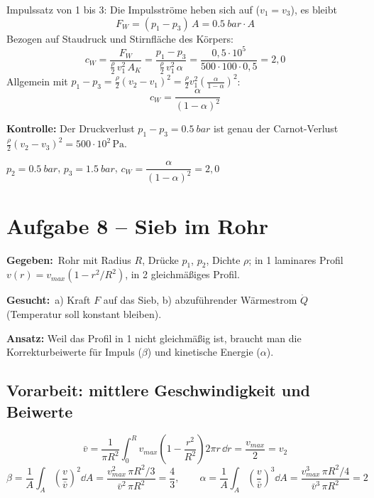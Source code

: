 \documentclass[11pt,a4paper]{article}
\newcommand{\gegeben}{\textbf{Gegeben:}\ }
\newcommand{\gesucht}{\textbf{Gesucht:}\ }
\begin{document}
Impulssatz von 1 bis 3: Die Impulsströme heben sich auf ($v_1 = v_3$), es bleibt
\[
F_W = (p_1 - p_3)\,A = \SI{0.5}{bar}\cdot A
\]
Bezogen auf Staudruck und Stirnfläche des Körpers:
\[
c_W = \frac{F_W}{\frac{\rho}{2}\,v_1^2\,A_K} = \frac{p_1 - p_3}{\frac{\rho}{2}\,v_1^2\,\alpha} = \frac{0{,}5\cdot 10^5}{500\cdot 100\cdot 0{,}5} = 2{,}0
\]
Allgemein mit $p_1 - p_3 = \frac{\rho}{2}(v_2 - v_1)^2 = \frac{\rho}{2}v_1^2\left(\frac{\alpha}{1-\alpha}\right)^2$:
\[
c_W = \frac{\alpha}{(1 - \alpha)^2}
\]

\textbf{Kontrolle:} Der Druckverlust $p_1 - p_3 = \SI{0.5}{bar}$ ist genau der Carnot-Verlust $\frac{\rho}{2}(v_2 - v_3)^2 = 500\cdot 10^2\,\mathrm{Pa}$. \checkmark

\begin{ergebnis}
$p_2 = \SI{0.5}{bar}$, \quad $p_3 = \SI{1.5}{bar}$, \quad $c_W = \dfrac{\alpha}{(1-\alpha)^2} = 2{,}0$
\end{ergebnis}

\section{Aufgabe 8 -- Sieb im Rohr}

\begin{bild}

\end{bild}

\gegeben Rohr mit Radius $R$, Drücke $p_1$, $p_2$, Dichte $\rho$; in 1 laminares Profil $v(r) = v_{max}\left(1 - r^2/R^2\right)$, in 2 gleichmäßiges Profil.

\gesucht a) Kraft $F$ auf das Sieb, b) abzuführender Wärmestrom $\dot Q$ (Temperatur soll konstant bleiben).

\textbf{Ansatz:} Weil das Profil in 1 nicht gleichmäßig ist, braucht man die Korrekturbeiwerte für Impuls ($\beta$) und kinetische Energie ($\alpha$).

\subsection*{Vorarbeit: mittlere Geschwindigkeit und Beiwerte}
\[
\bar v = \frac{1}{\pi R^2}\int_0^R v_{max}\left(1 - \frac{r^2}{R^2}\right) 2\pi r\,\dd r = \frac{v_{max}}{2} = v_2
\]
\[
\beta = \frac{1}{A}\int_A\left(\frac{v}{\bar v}\right)^2 \dd A = \frac{v_{max}^2\,\pi R^2/3}{\bar v^2\,\pi R^2} = \frac43,
\qquad
\alpha = \frac{1}{A}\int_A\left(\frac{v}{\bar v}\right)^3 \dd A = \frac{v_{max}^3\,\pi R^2/4}{\bar v^3\,\pi R^2} = 2
\]
\end{document}
